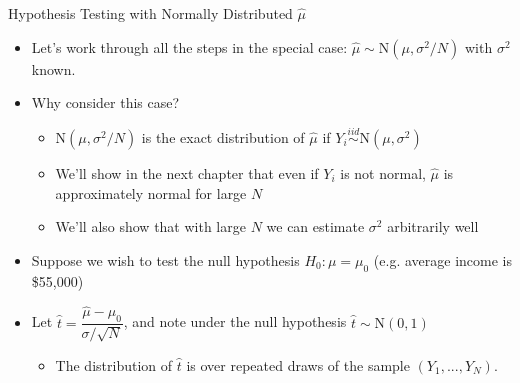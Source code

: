 \documentclass[11pt,english,handout]{beamer}
\begin{document}
\begin{frame}{Hypothesis Testing with Normally Distributed $\hat\mu$}
\begin{itemize}
	\item 
	Let's work through all the steps in the special case: $\hat\mu \sim \mathrm{N}(\mu, \sigma^2/N)$ with $\sigma^2$ known. 
	\medskip
	\pause
	\item
	Why consider this case?
\smallskip
		\begin{itemize}
			\item 
			$\mathrm{N}(\mu, \sigma^2/N)$ is the exact distribution of $\hat\mu$ if $Y_i \overset{iid}{\sim} \mathrm{N}(\mu,\sigma^2)$ \pause
			\smallskip
			\item
			We'll show in the next chapter that even if $Y_i$ is not normal, $\hat\mu$ is approximately normal for large $N$
\smallskip\pause{}
\item We'll also show that with large $N$ we can estimate $\sigma^2$ arbitrarily well
		\end{itemize}

	\pause
	\item
	Suppose we wish to test the null hypothesis $H_0:\mu=\mu_0$ (e.g. average income is \$55,000)
	
	
	\item
	Let $\hat{t} = \dfrac{\hat\mu - \mu_0 }{ \sigma /\sqrt{N} }$, and note under the null hypothesis $\hat{t} \sim \mathrm{N}(0,1)$ 
	\begin{itemize}
	\pause
	\item
	The distribution of $\hat{t}$ is over repeated draws of the sample $(Y_1,...,Y_N)$.
		\end{itemize}
\end{itemize}
\end{frame}
\end{document}

